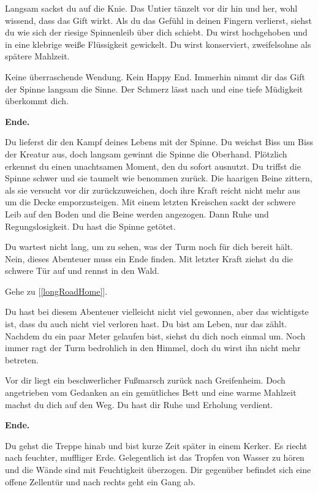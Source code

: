 Langsam sackst du auf die Knie. Das Untier tänzelt vor dir hin und her, wohl wissend, dass das Gift wirkt. Als du das Gefühl in deinen Fingern verlierst, siehst du wie sich der riesige Spinnenleib über dich schiebt. Du wirst hochgehoben und in eine klebrige weiße Flüssigkeit gewickelt. Du wirst konserviert, zweifelsohne als spätere Mahlzeit.

Keine überraschende Wendung. Kein Happy End. Immerhin nimmt dir das Gift der Spinne langsam die Sinne. Der Schmerz lässt nach und eine tiefe Müdigkeit überkommt dich.

\textbf{Ende.}


Du lieferst dir den Kampf deines Lebens mit der Spinne. Du weichst Biss um Biss der Kreatur aus, doch langsam gewinnt die Spinne die Oberhand. Plötzlich erkennst du einen unachtsamen Moment, den du sofort ausnutzt. Du triffst die Spinne schwer und sie taumelt wie benommen zurück. Die haarigen Beine zittern, als sie versucht vor dir zurückzuweichen, doch ihre Kraft reicht nicht mehr aus um die Decke emporzusteigen. Mit einem letzten Kreischen sackt der schwere Leib auf den Boden und die Beine werden angezogen. Dann Ruhe und Regungslosigkeit. Du hast die Spinne getötet.

Du wartest nicht lang, um zu sehen, was der Turm noch für dich bereit hält. Nein, dieses Abenteuer muss ein Ende finden. Mit letzter Kraft ziehst du die schwere Tür auf und rennst in den Wald.

Gehe zu [\ref{longRoadHome}].


Du hast bei diesem Abenteuer vielleicht nicht viel gewonnen, aber das wichtigste ist, dass du auch nicht viel verloren hast. Du bist am Leben, nur das zählt. Nachdem du ein paar Meter gelaufen bist, siehst du dich noch einmal um. Noch immer ragt der Turm bedrohlich in den Himmel, doch du wirst ihn nicht mehr betreten.

Vor dir liegt ein beschwerlicher Fußmarsch zurück nach Greifenheim. Doch angetrieben vom Gedanken an ein gemütliches Bett und eine warme Mahlzeit machst du dich auf den Weg. Du hast dir Ruhe und Erholung verdient.

\textbf{Ende.}


Du gehst die Treppe hinab und bist kurze Zeit später in einem Kerker. Es riecht nach feuchter, muffliger Erde. Gelegentlich ist das Tropfen von Wasser zu hören und die Wände sind mit Feuchtigkeit überzogen. Dir gegenüber befindet sich eine offene Zellentür und nach rechts geht ein Gang ab.

